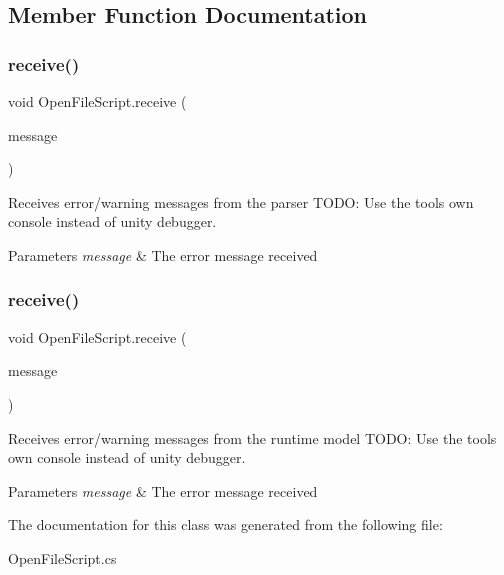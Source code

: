 \subsection{Member Function Documentation}
\mbox{\label{class_open_file_script_a94b7ce5bc20da9a8be4322c1eb53fd75}} 
\subsubsection{\texorpdfstring{receive()}{receive()}\hspace{0.1cm}{\footnotesize\ttfamily [1/2]}}
{\footnotesize\ttfamily void Open\+File\+Script.\+receive (\begin{DoxyParamCaption}\item[{M\+M.\+Parser.\+Parser\+Message}]{message }\end{DoxyParamCaption})}



Receives error/warning messages from the parser T\+O\+DO\+: Use the tools own console instead of unity debugger. 


\begin{DoxyParams}{Parameters}
{\em message} & The error message received\\
\hline
\end{DoxyParams}
\mbox{\label{class_open_file_script_aa2396d19a7620be7dd7e327865fc9501}} 
\subsubsection{\texorpdfstring{receive()}{receive()}\hspace{0.1cm}{\footnotesize\ttfamily [2/2]}}
{\footnotesize\ttfamily void Open\+File\+Script.\+receive (\begin{DoxyParamCaption}\item[{M\+M.\+Runtime.\+Checker\+Message}]{message }\end{DoxyParamCaption})}



Receives error/warning messages from the runtime model T\+O\+DO\+: Use the tools own console instead of unity debugger. 


\begin{DoxyParams}{Parameters}
{\em message} & The error message received\\
\hline
\end{DoxyParams}


The documentation for this class was generated from the following file\+:\begin{DoxyCompactItemize}
\item 
Open\+File\+Script.\+cs\end{DoxyCompactItemize}
